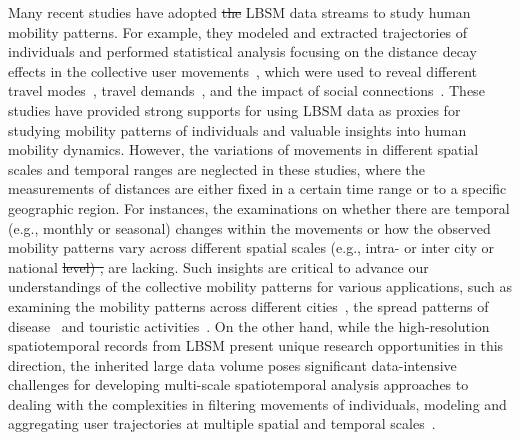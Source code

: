 \documentclass[ijgi,article,submit,moreauthors,pdftex,10pt,a4paper]{mdpi}
\theoremstyle{mdpi}
\newcounter{ex}
\newcounter{re}
\theoremstyle{mdpidefinition}
\providecommand{\DIFadd}[1]{{\protect\color{blue}\uwave{#1}}} %
\providecommand{\DIFdel}[1]{{\protect\color{red}\sout{#1}}}                      %
\providecommand{\DIFaddbegin}{} %
\providecommand{\DIFaddend}{} %
\providecommand{\DIFdelbegin}{} %
\providecommand{\DIFdelend}{} %
\begin{document}
Many recent studies have adopted \DIFdelbegin \DIFdel{the }\DIFdelend LBSM data streams to study human mobility patterns.
For example, they modeled and extracted trajectories of individuals and performed statistical analysis focusing on the distance decay effects in the collective user movements~\cite{gonzalez2008understanding}, which were used to reveal different travel modes~\cite{Jurdak2015}, travel demands~\cite{wu2014intra,hasan2013understanding}, and the impact of social connections~\cite{cho2011friendship}.
These studies have provided strong supports for using LBSM data as proxies for studying mobility patterns of individuals and valuable insights into human mobility dynamics.
However, the variations of movements in different spatial scales and temporal ranges are neglected in these studies, where the measurements of distances are either fixed in a certain time range or to a specific geographic region.
For instances, the examinations on whether there are temporal (e.g., monthly or seasonal) changes within the movements or how the observed mobility patterns vary across different spatial scales (e.g., intra- or inter city or national \DIFdelbegin \DIFdel{level) , }\DIFdelend \DIFaddbegin \DIFadd{levels) }\DIFaddend are lacking.
Such insights are critical to advance our understandings of the collective mobility patterns for various applications, such as examining the mobility patterns across different cities~\cite{noulas2012tale}, the spread patterns of disease~\cite{balcan2009multiscale, tamerius2011global} and touristic activities~\cite{hawelka2014geo}.
On the other hand, while the high-resolution spatiotemporal records from LBSM present unique research opportunities in this direction, the inherited large data volume poses significant data-intensive challenges for developing multi-scale spatiotemporal analysis approaches to dealing with the complexities in filtering movements of individuals, modeling and aggregating user trajectories at multiple spatial and temporal scales~\cite{tsou2015}.
\end{document}
